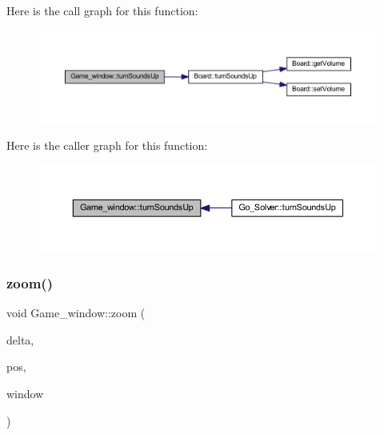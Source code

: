 Here is the call graph for this function\+:
\nopagebreak
\begin{figure}[H]
\begin{center}
\leavevmode
\includegraphics[width=350pt]{class_game__window_a1ba4f62d58089e3de5da00538889cb25_cgraph}
\end{center}
\end{figure}
Here is the caller graph for this function\+:
\nopagebreak
\begin{figure}[H]
\begin{center}
\leavevmode
\includegraphics[width=350pt]{class_game__window_a1ba4f62d58089e3de5da00538889cb25_icgraph}
\end{center}
\end{figure}
\mbox{\label{class_game__window_a9b9b15469cb0ced1a22f28e447983b56}} 
\subsubsection{\texorpdfstring{zoom()}{zoom()}}
{\footnotesize\ttfamily void Game\+\_\+window\+::zoom (\begin{DoxyParamCaption}\item[{const float}]{delta,  }\item[{sf\+::\+Vector2i}]{pos,  }\item[{sf\+::\+Render\+Window \&}]{window }\end{DoxyParamCaption})}

